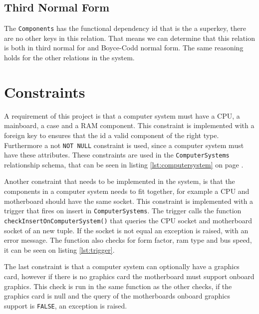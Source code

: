 \documentclass[12pt,a4paper]{article}
\begin{document}
\subsection{Third Normal Form}
The \texttt{Components} has the functional dependency id that is the a superkey, there are no other keys in this relation. That means we can determine that this relation is both in third normal for and Boyce-Codd normal form.
The same reasoning holds for the other relations in the system. 

\section{Constraints}
A requirement of this project is that a computer system must have a CPU, a mainboard, a case and a RAM component. 
This constraint is implemented with a foreign key to ensures that the id a valid component of the right type.
Furthermore a not \texttt{NOT NULL} constraint is used, since a computer system must have these attributes. 
These constraints are used in the \texttt{ComputerSystems} relationship schema, that can be seen in listing \ref{lst:computersystem} on page \pageref{lst:computersystem}.

Another constraint that needs to be implemented in the system, is that the components in a computer system needs to fit together, for example a CPU and motherboard should have the same socket.
This constraint is implemented with a trigger that fires on insert in \texttt{ComputerSystems}. The trigger calls the function \texttt{checkInsertOnComputerSystem()} that queries the CPU socket and motherboard socket of an new tuple. If the socket is not equal an exception is raised, with an error message. The function also checks for form factor, ram type and bus speed, it can be seen on listing \ref{lst:trigger}.

The last constraint is that a computer system can optionally have a graphics card, however if there is no graphics card the motherboard must support onboard graphics. 
This check is run in the same function as the other checks, if the  graphics card is null and the query of the motherboards onboard graphics support is \texttt{FALSE}, an exception is raised. 
\end{document}
